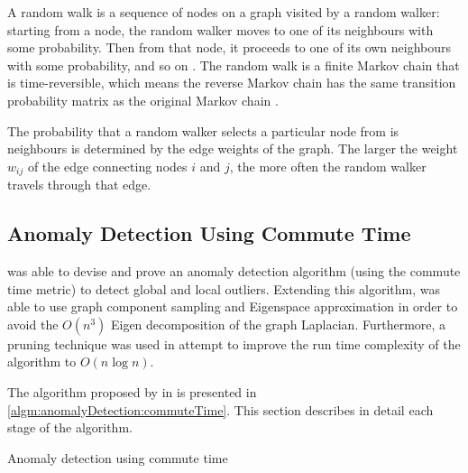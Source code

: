 A random walk is a sequence of nodes on a graph visited by a random walker:
starting from a node, the random walker moves to one of its neighbours with some
probability. Then from that node, it proceeds to one of its own neighbours with
some probability, and so on \cite{Khoa:2012}. The random walk is a finite Markov
chain that is time-reversible, which means the reverse Markov chain has the same
transition probability matrix as the original Markov chain \cite{Lovasz:1996}.

The probability that a random walker selects a particular node from is
neighbours is determined by the edge weights of the graph. The larger the weight
$w_{ij}$ of the edge connecting nodes $i$ and $j$, the more often the random
walker travels through that edge.

\subsection{Anomaly Detection Using Commute Time}
\label{commuteTime:anomalyDetection}
\citeauthor{Khoa:2012} was able to devise and prove an anomaly detection
algorithm (using the commute time metric) to detect global and local outliers.
Extending this algorithm, \citeauthor{Khoa:2012} was able to use graph component
sampling and Eigenspace approximation in order to avoid the $O(n^3)$ Eigen
decomposition of the graph Laplacian. Furthermore, a pruning technique was used
in attempt to improve the run time complexity of the algorithm to $O(n \log n)$.

The algorithm proposed by \citeauthor{Khoa:2012} in 
\cite{Khoa:2012} is presented in \autoref{algm:anomalyDetection:commuteTime}.
This section describes in detail each stage of the algorithm.

\begin{algorithm}
    
    \caption{Anomaly detection using commute time}
    \label{algm:anomalyDetection:commuteTime}
\end{algorithm}

